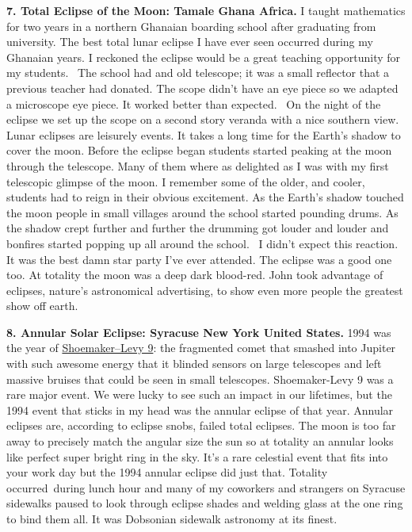 \textbf{7. Total Eclipse of the Moon: Tamale Ghana Africa.} I taught
mathematics for two years in a northern Ghanaian boarding school after
graduating from university. The best total lunar eclipse I have ever
seen occurred during my Ghanaian years. I reckoned the eclipse would be
a great teaching opportunity for my students. ~The school had and old
telescope; it was a small reflector that a previous teacher had donated.
The scope didn't have an eye piece so we adapted a microscope eye piece.
It worked better than expected. ~On the night of the eclipse we set up
the scope on a second story veranda with a nice southern view. Lunar
eclipses are leisurely events. It takes a long time for the Earth's
shadow to cover the moon. Before the eclipse began students started
peaking at the moon through the telescope. Many of them where as
delighted as I was with my first telescopic glimpse of the moon. I
remember some of the older, and cooler, students had to reign in their
obvious excitement. As the Earth's shadow touched the moon people in
small villages around the school started pounding drums. As the shadow
crept further and further the drumming got louder and louder and
bonfires started popping up all around the school. ~I didn't expect this
reaction. It was the best damn star party I've ever attended. The
eclipse was a good one too. At totality the moon was a deep dark
blood-red. John took advantage of eclipses, nature's astronomical
advertising, to show even more people the greatest show off earth.

\medskip

\textbf{8. Annular Solar Eclipse: Syracuse New York United States.} 1994
was the year of
\href{https://en.wikipedia.org/wiki/Comet\_Shoemaker\%E2\%80\%93Levy\_9}{Shoemaker--Levy
9}: the fragmented comet that smashed into Jupiter with such awesome
energy that it blinded sensors on large telescopes and left massive
bruises that could be seen in small telescopes. Shoemaker-Levy 9 was a
rare major event. We were lucky to see such an impact in our lifetimes,
but the 1994 event that sticks in my head was the annular eclipse of
that year. Annular eclipses are, according to eclipse snobs, failed
total eclipses. The moon is too far away to precisely match the angular
size the sun so at totality an annular looks like perfect super bright
ring in the sky. It's a rare celestial event that fits into your work
day but the 1994 annular eclipse did just that. Totality occurred~during
lunch hour and many of my coworkers and strangers on Syracuse sidewalks
paused to look through eclipse shades and welding glass at the one ring
to bind them all. It was Dobsonian sidewalk astronomy at its finest.

